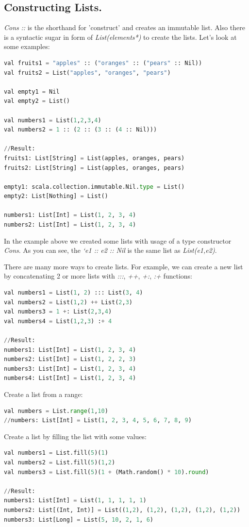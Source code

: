 \documentclass[12pt,twoside,a4paper]{report}
\begin{document}
\subsection{Constructing Lists.}\label{6.7.1}

\emph{Cons} \emph{::} is the shorthand for 'construct' and creates an immutable list. Also there is a syntactic sugar in form of \emph{List(elements*)} to create the lists. Let's look at some examples:
\begin{lstlisting}[language=python]
val fruits1 = "apples" :: ("oranges" :: ("pears" :: Nil))
val fruits2 = List("apples", "oranges", "pears")

val empty1 = Nil
val empty2 = List()

val numbers1 = List(1,2,3,4)
val numbers2 = 1 :: (2 :: (3 :: (4 :: Nil)))

//Result:
fruits1: List[String] = List(apples, oranges, pears)
fruits2: List[String] = List(apples, oranges, pears)

empty1: scala.collection.immutable.Nil.type = List()
empty2: List[Nothing] = List()

numbers1: List[Int] = List(1, 2, 3, 4)
numbers2: List[Int] = List(1, 2, 3, 4)
\end{lstlisting}

In the example above we created some lists with usage of a type constructor \emph{Cons}. As you can see, the \emph{`e1 :: e2 :: Nil} is the same list as \emph{List(e1,e2)}.

There are many more ways to create lists. For example, we can create a new list by concatenating 2 or more lists with \emph{:::}, \emph{++}, \emph{+:}, \emph{:+} functions:
\begin{lstlisting}[language=python]
val numbers1 = List(1, 2) ::: List(3, 4)
val numbers2 = List(1,2) ++ List(2,3) 
val numbers3 = 1 +: List(2,3,4) 
val numbers4 = List(1,2,3) :+ 4 

//Result:
numbers1: List[Int] = List(1, 2, 3, 4)
numbers2: List[Int] = List(1, 2, 2, 3)
numbers3: List[Int] = List(1, 2, 3, 4)
numbers4: List[Int] = List(1, 2, 3, 4)
\end{lstlisting}

Create a list from a range:
\begin{lstlisting}[language=python]
val numbers = List.range(1,10)
//numbers: List[Int] = List(1, 2, 3, 4, 5, 6, 7, 8, 9)
\end{lstlisting}

Create a list by filling the list with some values:
\begin{lstlisting}[language=python]
val numbers1 = List.fill(5)(1)
val numbers2 = List.fill(5)(1,2)
val numbers3 = List.fill(5)(1 + (Math.random() * 10).round)

//Result:
numbers1: List[Int] = List(1, 1, 1, 1, 1)
numbers2: List[(Int, Int)] = List((1,2), (1,2), (1,2), (1,2), (1,2))
numbers3: List[Long] = List(5, 10, 2, 1, 6)
\end{lstlisting}
\end{document}
